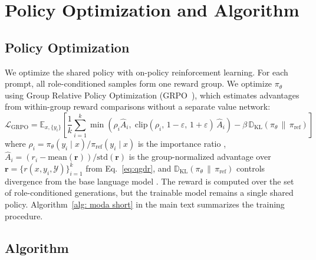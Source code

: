 \section{Policy Optimization and Algorithm}
\label{appx:policy-optimization-algorithm}

\subsection{Policy Optimization}
\label{subsec:policy_optimization}

We optimize the shared policy with on-policy reinforcement learning. For each prompt, all role-conditioned samples form one reward group. We optimize $\pi_\theta$ using Group Relative Policy Optimization
(GRPO~\citep{shao2024deepseekmath}), which estimates advantages from
within-group reward comparisons without a separate value network:
\begin{equation}
    \mathcal{L}_{\mathrm{GRPO}}
    = \mathbb{E}_{x,\{y_i\}}\!\left[
        \frac{1}{k} \sum_{i=1}^{k}
        \min\!\left(
            \rho_i \hat{A}_i,\;
            \mathrm{clip}(\rho_i,\, 1{-}\varepsilon,\, 1{+}\varepsilon)\,\hat{A}_i
        \right)
        - \beta\,\mathbb{D}_{\mathrm{KL}}\!\left(\pi_\theta \,\|\, \pi_{\mathrm{ref}}\right)
    \right]
    \label{eq:grpo}
\end{equation}
where $\rho_i = \pi_\theta(y_i \mid x) / \pi_{\mathrm{ref}}(y_i \mid x)$ is the
importance ratio \citep{kloek1978bayesian}, $\hat{A}_i = (r_i - \mathrm{mean}(\mathbf{r})) /
\mathrm{std}(\mathbf{r})$ is the group-normalized advantage over
$\mathbf{r} = \{r(x, y_i, \mathcal{Y})\}_{i=1}^{k}$
from Eq.~\ref{eq:qgdr}, and $\mathbb{D}_{\mathrm{KL}}\!(\pi_\theta \,\|\, \pi_{\mathrm{ref}})$ controls divergence from the base language model \citep{jaques2017sequencetutorconservativefinetuning}.
The reward is computed over the set of role-conditioned generations, but the trainable model remains a single shared policy. Algorithm~\ref{alg: moda short} in the main text summarizes the training procedure.

\subsection{Algorithm}
\label{appx:algorithm}

